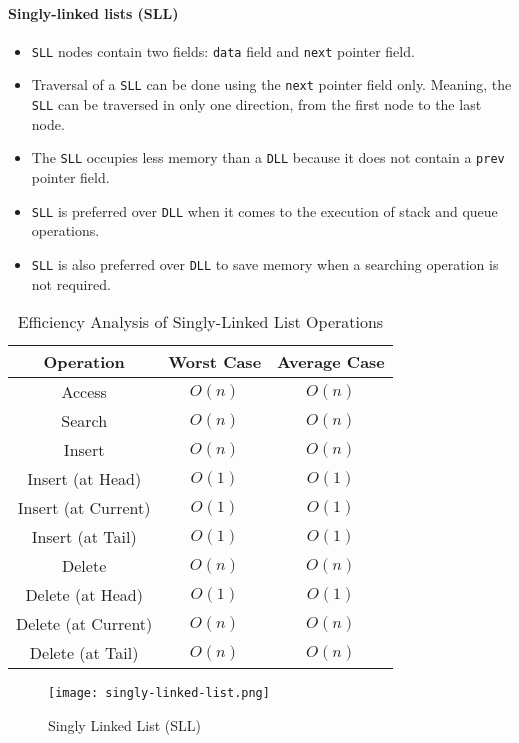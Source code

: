 \paragraph{Singly-linked lists (SLL)}
\begin{itemize}
    \item \lstinline{SLL} nodes contain two fields: \lstinline{data} field and \lstinline{next} pointer field.
    \item Traversal of a \lstinline{SLL} can be done using the \lstinline{next} pointer field only. Meaning, the \lstinline{SLL} can be traversed in only one direction, from the first node to the last node.
    \item The \lstinline{SLL} occupies less memory than a \lstinline{DLL} because it does not contain a \lstinline{prev} pointer field.
    \item \lstinline{SLL} is preferred over \lstinline{DLL} when it comes to the execution of stack and queue operations.
    \item \lstinline{SLL} is also preferred over \lstinline{DLL} to save memory when a searching operation is not required.
\end{itemize}
\begin{table}[h]
    \centering
    \caption{Efficiency Analysis of Singly-Linked List Operations}
    \label{tab:singly-linked-list-efficiency-analysis}
    \begin{tabular}{|c|c|c|}
        \hline
        Operation           & Worst Case & Average Case \\ \hline
        Access              & $O(n)$     & $O(n)$       \\ \hline
        Search              & $O(n)$     & $O(n)$       \\ \hline
        Insert              & $O(n)$     & $O(n)$       \\ \hline
        Insert (at Head)    & $O(1)$     & $O(1)$       \\ \hline
        Insert (at Current) & $O(1)$     & $O(1)$       \\ \hline
        Insert (at Tail)    & $O(1)$     & $O(1)$       \\ \hline
        Delete              & $O(n)$     & $O(n)$       \\ \hline
        Delete (at Head)    & $O(1)$     & $O(1)$       \\ \hline
        Delete (at Current) & $O(n)$     & $O(n)$       \\ \hline
        Delete (at Tail)    & $O(n)$     & $O(n)$       \\ \hline
    \end{tabular}
\end{table}
\begin{figure}[!htbp]
    \centering
    \texttt{[image: singly-linked-list.png]}
    \caption{Singly Linked List (SLL) \cite{vaghani_2023}}
    \label{fig:singly-linked-list}
\end{figure}

